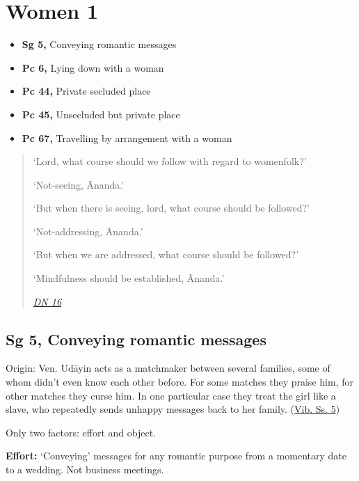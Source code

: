 \chapter{Women 1}

\begin{itemize}
\tightlist
\item
  \textbf{Sg 5,} Conveying romantic messages
\item
  \textbf{Pc 6,} Lying down with a woman
\item
  \textbf{Pc 44,} Private secluded place
\item
  \textbf{Pc 45,} Unsecluded but private place
\item
  \textbf{Pc 67,} Travelling by arrangement with a woman
\end{itemize}


\begin{quote}
`Lord, what course should we follow with regard to womenfolk?'

`Not-seeing, Ānanda.'

`But when there is seeing, lord, what course should be followed?'

`Not-addressing, Ānanda.'

`But when we are addressed, what course should be followed?'

`Mindfulness should be established, Ānanda.'

\emph{\href{https://www.dhammatalks.org/suttas/DN/DN16.html}{DN 16}}
\end{quote}

\section{Sg 5, Conveying romantic messages}

Origin: Ven. Udāyin acts as a matchmaker between several families, some
of whom didn't even know each other before. For some matches they praise
him, for other matches they curse him. In one particular case they treat
the girl like a slave, who repeatedly sends unhappy messages back to her
family.
(\href{https://suttacentral.net/pli-tv-bu-vb-ss5/en/brahmali}{Vib. Ss.
5})

Only two factors: effort and object.

\textbf{Effort:} `Conveying' messages for any romantic purpose from a
momentary date to a wedding. Not business meetings.

\clearpage

